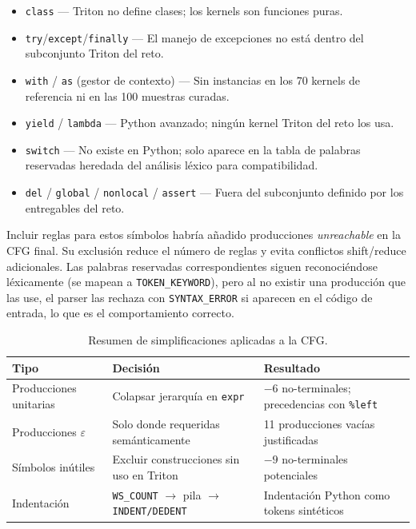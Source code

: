 \begin{itemize}
  \item \texttt{class} --- Triton no define clases; los kernels son funciones puras.
  \item \texttt{try}/\texttt{except}/\texttt{finally} --- El manejo de excepciones
    no está dentro del subconjunto Triton del reto.
  \item \texttt{with} / \texttt{as} (gestor de contexto) --- Sin instancias en
    los 70 kernels de referencia ni en las 100 muestras curadas.
  \item \texttt{yield} / \texttt{lambda} --- Python avanzado; ningún kernel Triton
    del reto los usa.
  \item \texttt{switch} --- No existe en Python; solo aparece en la tabla de
    palabras reservadas heredada del análisis léxico para compatibilidad.
  \item \texttt{del} / \texttt{global} / \texttt{nonlocal} / \texttt{assert} --- Fuera del
    subconjunto definido por los entregables del reto.
\end{itemize}

Incluir reglas para estos símbolos habría añadido producciones \textit{unreachable}
en la CFG final. Su exclusión reduce el número de reglas y evita conflictos
shift/reduce adicionales. Las palabras reservadas correspondientes siguen
reconociéndose léxicamente (se mapean a \texttt{TOKEN\_KEYWORD}), pero al no
existir una producción que las use, el parser las rechaza con \texttt{SYNTAX\_ERROR}
si aparecen en el código de entrada, lo que es el comportamiento correcto.

\begin{table}[H]
\centering
\caption{Resumen de simplificaciones aplicadas a la CFG.}
\label{tab:simplificaciones}
\begin{tabular}{@{}p{3.5cm}p{4.2cm}p{5cm}@{}}
\toprule
\textbf{Tipo} & \textbf{Decisión} & \textbf{Resultado} \\
\midrule
Producciones unitarias & Colapsar jerarquía en \texttt{expr} & $-6$ no-terminales; precedencias con \texttt{\%left} \\
Producciones $\varepsilon$ & Solo donde requeridas semánticamente & 11 producciones vacías justificadas \\
Símbolos inútiles & Excluir construcciones sin uso en Triton & $-9$ no-terminales potenciales \\
Indentación & \texttt{WS\_COUNT} $\rightarrow$ pila $\rightarrow$ \texttt{INDENT/DEDENT} & Indentación Python como tokens sintéticos \\
\bottomrule
\end{tabular}
\end{table}

